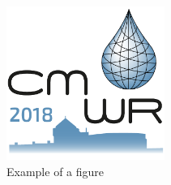 \documentclass{cmwr2018}[10]
\begin{document}
%
%
%
\begin{figure}[hbt]
\centering
\includegraphics[height=5cm]{Logo_CMWR2018}
\caption{Example of a figure}
\label{fig:figure}
\end{figure}
%
%
%
\end{document}
